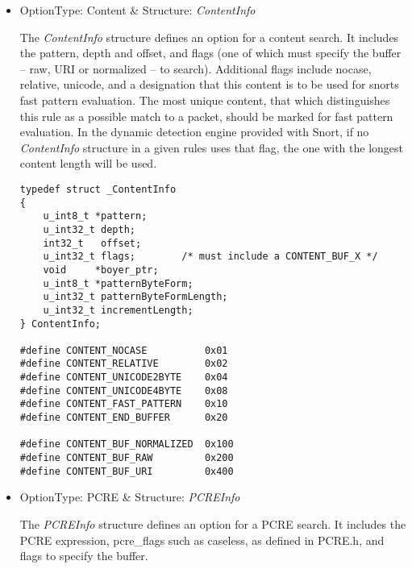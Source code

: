 \documentclass[english]{report}
\begin{document}
\begin{itemize}
%
%

\item {OptionType: Content \& Structure: {\em ContentInfo}}

The {\em ContentInfo} structure defines an option for a content search.  It
includes the pattern, depth and offset, and flags (one of which must specify
the buffer -- raw, URI or normalized -- to search).  Additional flags include
nocase, relative, unicode, and a designation that this content is to be used
for snorts fast pattern evaluation.  The most unique content, that which
distinguishes this rule as a possible match to a packet, should be marked for
fast pattern evaluation.  In the dynamic detection engine provided with Snort,
if no {\em ContentInfo} structure in a given rules uses that flag, the one with
the longest content length will be used.

\begin{verbatim}
typedef struct _ContentInfo
{
    u_int8_t *pattern;
    u_int32_t depth;
    int32_t   offset;
    u_int32_t flags;        /* must include a CONTENT_BUF_X */
    void     *boyer_ptr;
    u_int8_t *patternByteForm;
    u_int32_t patternByteFormLength;
    u_int32_t incrementLength;
} ContentInfo;

#define CONTENT_NOCASE          0x01
#define CONTENT_RELATIVE        0x02
#define CONTENT_UNICODE2BYTE    0x04
#define CONTENT_UNICODE4BYTE    0x08
#define CONTENT_FAST_PATTERN    0x10
#define CONTENT_END_BUFFER      0x20

#define CONTENT_BUF_NORMALIZED  0x100
#define CONTENT_BUF_RAW         0x200
#define CONTENT_BUF_URI         0x400
\end{verbatim}

\item {OptionType: PCRE \& Structure: {\em PCREInfo}}

The {\em PCREInfo} structure defines an option for a PCRE search.  It includes
the PCRE expression, pcre\_flags such as caseless, as defined in PCRE.h, and
flags to specify the buffer.


\end{itemize}
\end{document}
